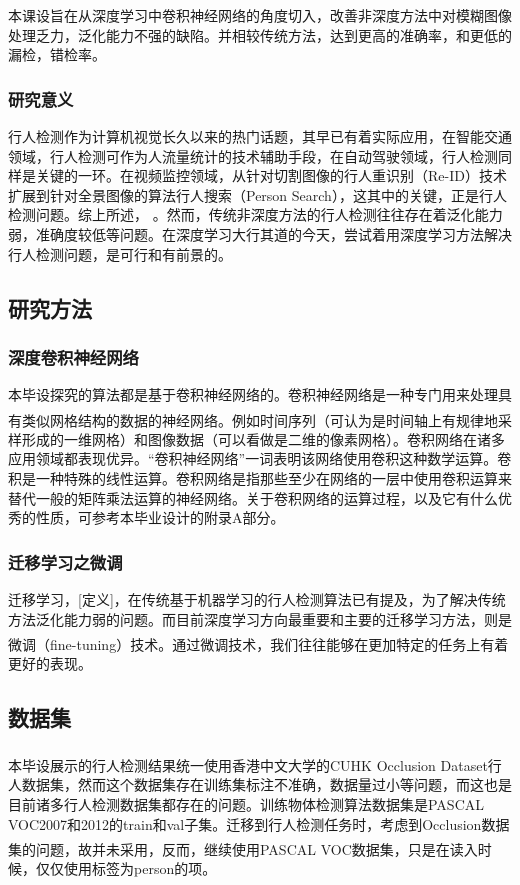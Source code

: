 \documentclass[12pt,a4paper,titlepage]{article}
\newcommand{\upcite}[1]{\textsuperscript{\textsuperscript{\cite{#1}}}}  %
\begin{document}
本课设旨在从深度学习中卷积神经网络的角度切入，改善非深度方法中对模糊图像处理乏力，泛化能力不强的缺陷。并相较传统方法，达到更高的准确率，和更低的漏检，错检率。 
\subsubsection{研究意义}
行人检测作为计算机视觉长久以来的热门话题，其早已有着实际应用，在智能交通领域，行人检测可作为人流量统计的技术辅助手段，在自动驾驶领域，行人检测同样是关键的一环。在视频监控领域，从针对切割图像的行人重识别（Re-ID）技术扩展到针对全景图像的算法行人搜索（Person Search），这其中的关键，正是行人检测问题。综上所述， 。然而，传统非深度方法的行人检测往往存在着泛化能力弱，准确度较低等问题。在深度学习大行其道的今天，尝试着用深度学习方法解决行人检测问题，是可行和有前景的。

\subsection{研究方法}
\subsubsection{深度卷积神经网络}
本毕设探究的算法都是基于卷积神经网络的。卷积神经网络是一种专门用来处理具有类似网格结构的数据的神经网络\upcite{Goodfellow-et-al-2016}。例如时间序列（可认为是时间轴上有规律地采样形成的一维网格）和图像数据（可以看做是二维的像素网格）。卷积网络在诸多应用领域都表现优异。“卷积神经网络”一词表明该网络使用卷积这种数学运算。卷积是一种特殊的线性运算。卷积网络是指那些至少在网络的一层中使用卷积运算来替代一般的矩阵乘法运算的神经网络。关于卷积网络的运算过程，以及它有什么优秀的性质，可参考本毕业设计的附录A部分。

\subsubsection{迁移学习之微调}
迁移学习，[定义]，在传统基于机器学习的行人检测算法已有提及，为了解决传统方法泛化能力弱的问题。而目前深度学习方向最重要和主要的迁移学习方法，则是微调（fine-tuning）技术\upcite{yosinski2014transferable}。通过微调技术，我们往往能够在更加特定的任务上有着更好的表现。

\subsection{数据集}
本毕设展示的行人检测结果统一使用香港中文大学的CUHK Occlusion Dataset\upcite{ouyang2012discriminative}行人数据集，然而这个数据集存在训练集标注不准确，数据量过小等问题，而这也是目前诸多行人检测数据集都存在的问题。训练物体检测算法数据集是PASCAL VOC2007和2012的train和val子集。迁移到行人检测任务时，考虑到Occlusion数据集的问题，故并未采用，反而，继续使用PASCAL VOC\upcite{pascal-voc-2007}数据集，只是在读入时候，仅仅使用标签为person的项。
\end{document}
